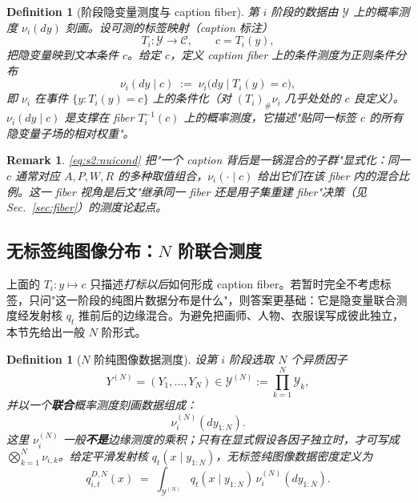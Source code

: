 \documentclass[11pt,a4paper]{article}
\newtheorem{definition}[theorem]{Definition}
\newtheorem{remark}[theorem]{Remark}
\newcommand{\cY}{\mathcal{Y}}
\newcommand{\cC}{\mathcal{C}}
\begin{document}
\begin{definition}[阶段隐变量测度与 caption fiber]\label{def:s2:nui}
第 $i$ 阶段的数据由 $\cY$ 上的概率测度 $\nu_i(dy)$ 刻画。设可测的\emph{标签映射}（caption 标注）
\begin{equation}\label{eq:s2:labelmap}
T_i:\cY\to\cC,\qquad c=T_i(y),
\end{equation}
把隐变量映到文本条件 $c$。给定 $c$，定义 \emph{caption fiber} 上的条件测度为正则条件分布
\begin{equation}\label{eq:s2:nuicond}
\nu_i(dy\mid c)\;:=\;\nu_i\bigl(dy \mid T_i(y)=c\bigr),
\end{equation}
即 $\nu_i$ 在事件 $\{y:T_i(y)=c\}$ 上的条件化（对 $(T_i)_\#\nu_i$ 几乎处处的 $c$ 良定义）。$\nu_i(dy\mid c)$ 是支撑在 fiber $T_i^{-1}(c)$ 上的概率测度，它描述"贴同一标签 $c$ 的所有隐变量子场的相对权重"。
\end{definition}

\begin{remark}\label{rem:s2:fiberidea}
\eqref{eq:s2:nuicond} 把"一个 caption 背后是一锅混合的子群"显式化：同一 $c$ 通常对应 $A,P,W,R$ 的多种取值组合，$\nu_i(\cdot\mid c)$ 给出它们在该 fiber 内的混合比例。这一 fiber 视角是后文"继承同一 fiber 还是用子集重建 fiber"决策（见 Sec.~\ref{sec:fiber}）的测度论起点。
\end{remark}

\subsection{无标签纯图像分布：$N$ 阶联合测度}\label{ss:s2:unlabeledN}

上面的 $T_i:y\mapsto c$ 只描述\emph{打标以后}如何形成 caption fiber。若暂时完全不考虑标签，只问"这一阶段的纯图片数据分布是什么"，则答案更基础：它是隐变量联合测度经发射核 $q_t$ 推前后的边缘混合。为避免把画师、人物、衣服误写成彼此独立，本节先给出一般 $N$ 阶形式。

\begin{definition}[$N$ 阶纯图像数据测度]\label{def:s2:unlabeledN}
设第 $i$ 阶段选取 $N$ 个异质因子
\[
Y^{(N)}=(Y_1,\ldots,Y_N)\in\cY^{(N)}:=\prod_{k=1}^{N}\cY_k,
\]
并以一个\textbf{联合}概率测度刻画数据组成：
\begin{equation}\label{eq:s2:nuN}
\nu_i^{(N)}(dy_{1:N}).
\end{equation}
这里 $\nu_i^{(N)}$ 一般\textbf{不是}边缘测度的乘积；只有在显式假设各因子独立时，才可写成 $\bigotimes_{k=1}^{N}\nu_{i,k}$。给定平滑发射核 $q_t(x\mid y_{1:N})$，无标签纯图像数据密度定义为
\begin{equation}\label{eq:s2:qDN}
q_{i,t}^{D,N}(x)
\;=\;
\int_{\cY^{(N)}} q_t(x\mid y_{1:N})\,\nu_i^{(N)}(dy_{1:N}).
\end{equation}
\end{definition}
\end{document}
